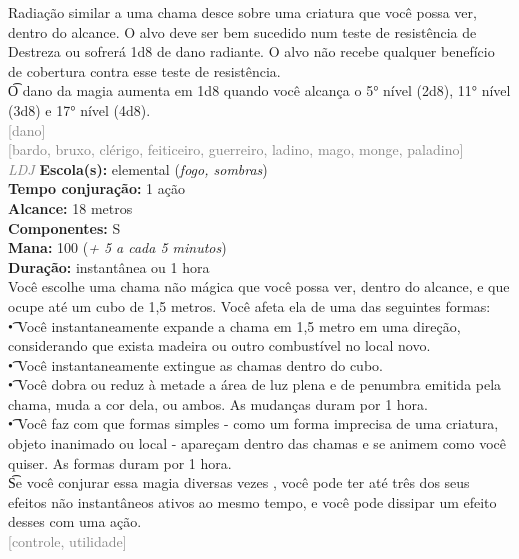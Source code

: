 \documentclass{RPG_Adventure}[2021/10/20]
\begin{document}
{\normalsize Radiação similar a uma chama desce sobre uma criatura que você possa ver, dentro do alcance. O alvo deve ser bem sucedido num teste de resistência de Destreza ou sofrerá 1d8 de dano radiante. O alvo não recebe qualquer benefício de cobertura contra esse teste de resistência.\\\t O dano da magia aumenta em 1d8 quando você alcança o 5° nível (2d8), 11° nível (3d8) e 17° nível (4d8).\\}
{\scriptsize \textcolor{gray}{[dano]\\}}
{\scriptsize \textcolor{gray}{[bardo, bruxo, clérigo, feiticeiro, guerreiro, ladino, mago, monge, paladino]\\}}
{\tiny \textcolor{gray}{\textit{LDJ}}}\jump{}
{\small \t \textbf{Escola(s):} elemental (\textit{fogo, sombras})\\\t \textbf{Tempo conjuração:} 1 ação\\\t \textbf{Alcance:} 18 metros\\\t \textbf{Componentes:} S\\\t \textbf{Mana:} 100 (\textit{+ 5 a cada 5 minutos})\\\t \textbf{Duração:} instantânea ou 1 hora\\}
{\normalsize Você escolhe uma chama não mágica que você possa ver, dentro do alcance, e que ocupe até um cubo de 1,5 metros. Você afeta ela de uma das seguintes formas:\\\t • Você instantaneamente expande a chama em 1,5 metro em uma direção, considerando que exista madeira ou outro combustível no local novo.\\\t • Você instantaneamente extingue as chamas dentro do cubo.\\\t • Você dobra ou reduz à metade a área de luz plena e de penumbra emitida pela chama, muda a cor dela, ou ambos. As mudanças duram por 1 hora.\\\t • Você faz com que formas simples - como um forma imprecisa de uma criatura, objeto inanimado ou local - apareçam dentro das chamas e se animem como você quiser. As formas duram por 1 hora.\\\t Se você conjurar essa magia diversas vezes , você pode ter até três dos seus efeitos não instantâneos ativos ao mesmo tempo, e você pode dissipar um efeito desses com uma ação.\\}
{\scriptsize \textcolor{gray}{[controle, utilidade]\\}}
\end{document}
